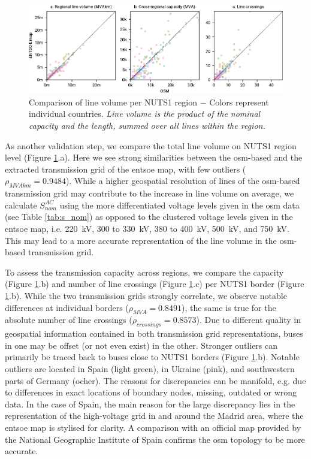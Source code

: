 \documentclass[fleqn,10pt]{wlscirep}
\let\autocite\cite
\begin{document}
\begin{figure}[!htbp]
    \centering
    \includegraphics{figures/fig_scatter_joined.pdf}
    \caption{Comparison of line volume per NUTS1 region $-$ Colors represent individual countries. \textit{Line volume is the product of the nominal capacity and the length, summed over all lines within the region.}}
    \label{fig:scatter_joined}
\end{figure}

As another validation step, we compare the total line volume on NUTS1 region level (Figure \ref{fig:scatter_joined}.a). Here we see strong similarities between the \acrshort{osm}-based and the extracted transmission grid of the \acrshort{entsoe} map, with few outliers ($\rho_{MVAkm} = 0.9484$). While a higher geospatial resolution of lines of the \gls{osm}-based transmission grid may contribute to the increase in line volume on average, we calculate $S_{nom}^{AC}$ using the more differentiated voltage levels given in the \gls{osm} data (see Table \ref{tab:s_nom}) as opposed to the clustered voltage levels given in the \acrshort{entsoe} map, i.e. \SI{220}{\kilo\volt}, 300 to \SI{330}{\kilo\volt}, 380 to \SI{400}{\kilo\volt}, \SI{500}{\kilo\volt}, and \SI{750}{\kilo\volt}. This may lead to a more accurate representation of the line volume in the \gls{osm}-based transmission grid.

To assess the transmission capacity across regions, we compare the capacity (Figure \ref{fig:scatter_joined}.b) and number of line crossings (Figure \ref{fig:scatter_joined}.c) per NUTS1 border (Figure \ref{fig:scatter_joined}.b). While the two transmission grids strongly correlate, we observe notable differences at individual borders ($\rho_{MVA} = 0.8491$), the same is true for the absolute number of line crossings ($\rho_{crossings} = 0.8573$). Due to different quality in geospatial information contained in both transmission grid representations, buses in one may be offset (or not even exist) in the other. Stronger outliers can primarily be traced back to buses close to NUTS1 borders (Figure \ref{fig:scatter_joined}.b). Notable outliers are located in Spain (light green), in Ukraine (pink), and southwestern parts of Germany (ocher). The reasons for discrepancies can be manifold, e.g. due to differences in exact locations of boundary nodes, missing, outdated or wrong data. In the case of Spain, the main reason for the large discrepancy lies in the representation of the high-voltage grid in and around the Madrid area, where the \acrshort{entsoe} map is stylised for clarity. A comparison with an official map provided by the National Geographic Institute of Spain\autocite{institutogeograficonacionalEnergiaMapaRed2016} confirms the \gls{osm} topology to be more accurate.
\end{document}
